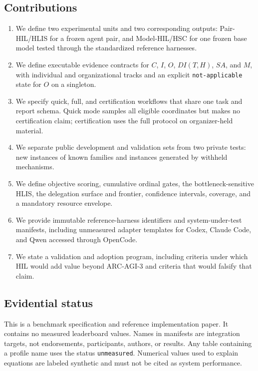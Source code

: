 \documentclass[11pt]{article}
\theoremstyle{definition}
\begin{document}
\subsection{Contributions}

\begin{enumerate}
\item We define two experimental units and two corresponding outputs: Pair-HIL/HLIS for a frozen agent pair, and Model-HIL/HSC for one frozen base model tested through the standardized reference harnesses.
\item We define executable evidence contracts for $C$, $I$, $O$, $DI(T,H)$, $SA$, and $M$, with individual and organizational tracks and an explicit \texttt{not-applicable} state for $O$ on a singleton.
\item We specify quick, full, and certification workflows that share one task and report schema. Quick mode samples all eligible coordinates but makes no certification claim; certification uses the full protocol on organizer-held material.
\item We separate public development and validation sets from two private tests: new instances of known families and instances generated by withheld mechanisms.
\item We define objective scoring, cumulative ordinal gates, the bottleneck-sensitive HLIS, the delegation surface and frontier, confidence intervals, coverage, and a mandatory resource envelope.
\item We provide immutable reference-harness identifiers and system-under-test manifests, including unmeasured adapter templates for Codex, Claude Code, and Qwen accessed through OpenCode.
\item We state a validation and adoption program, including criteria under which HIL would add value beyond ARC-AGI-3 and criteria that would falsify that claim.
\end{enumerate}

\subsection{Evidential status}

This is a benchmark specification and reference implementation paper. It contains no measured leaderboard values. Names in manifests are integration targets, not endorsements, participants, authors, or results. Any table containing a profile name uses the status \texttt{unmeasured}. Numerical values used to explain equations are labeled synthetic and must not be cited as system performance.
\end{document}
